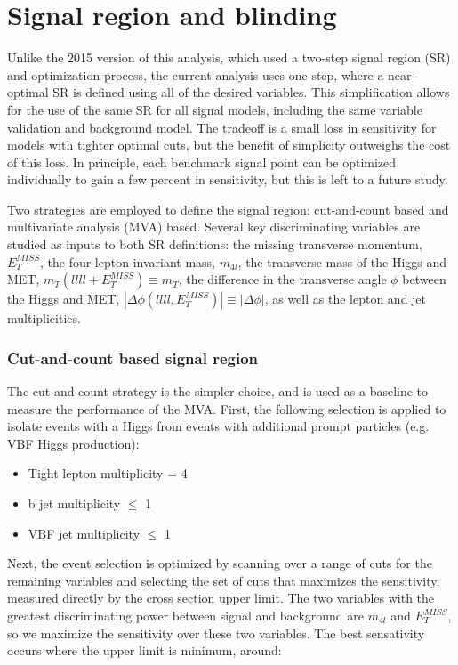 \chapter{Signal region and blinding}

Unlike the 2015 version of this analysis, which used a two-step signal region (SR) and optimization process, the current analysis uses one step, where a near-optimal SR is defined using all of the desired variables. This simplification allows for the use of the same SR for all signal models, including the same variable validation and background model. The tradeoff is a small loss in sensitivity for models with tighter optimal cuts, but the benefit of simplicity outweighs the cost of this loss. In principle, each benchmark signal point can be optimized individually to gain a few percent in sensitivity, but this is left to a future study.

Two strategies are employed to define the signal region: cut-and-count based and multivariate analysis (MVA) based. Several key discriminating variables are studied as inputs to both SR definitions: the missing transverse momentum, $E_T^{MISS}$, the four-lepton invariant mass, $m_{4l}$, the transverse mass of the Higgs and MET, $m_T(llll+E_T^{MISS}) \equiv m_T$, the difference in the transverse angle $\phi$ between the Higgs and MET, $|\Delta\phi(llll, E_T^{MISS})| \equiv |\Delta\phi|$, as well as the lepton and jet multiplicities.

\subsection{Cut-and-count based signal region} \label{cutandcountopt}

The cut-and-count strategy is the simpler choice, and is used as a baseline to measure the performance of the MVA. First, the following selection is applied to isolate events with a Higgs from events with additional prompt particles (e.g. VBF Higgs production):

\begin{itemize}
\item Tight lepton multiplicity = 4
\item b jet multiplicity $\leq$ 1
\item VBF jet multiplicity $\leq$ 1
\end{itemize}

Next, the event selection is optimized by scanning over a range of cuts for the remaining variables and selecting the set of cuts that maximizes the sensitivity, measured directly by the cross section upper limit. The two variables with the greatest discriminating power between signal and background are $m_{4l}$ and $E_T^{MISS}$, so we maximize the sensitivity over these two variables. The best sensativity occurs where the upper limit is minimum, around:

